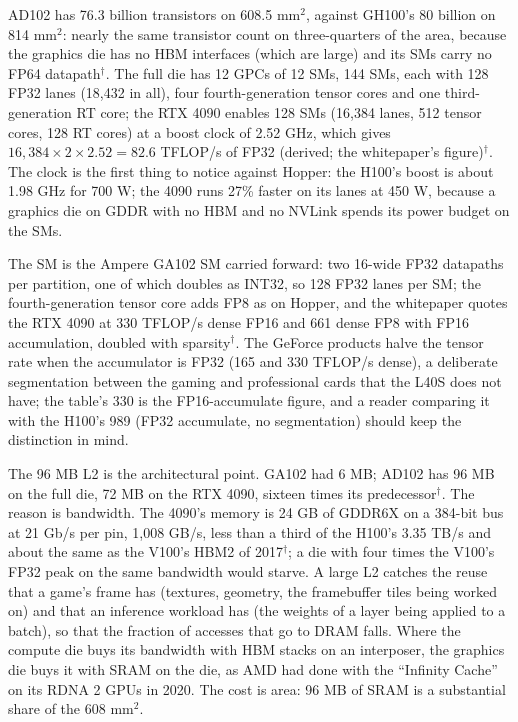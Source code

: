 \documentclass[11pt,letterpaper]{article}
\begin{document}
AD102 has 76.3 billion transistors on 608.5 mm$^2$, against GH100's 80 billion on 814 mm$^2$: nearly the same transistor count on three-quarters of the area, because the graphics die has no HBM interfaces (which are large) and its SMs carry no FP64 datapath$^\dagger$. The full die has 12 GPCs of 12 SMs, 144 SMs, each with 128 FP32 lanes (18{,}432 in all), four fourth-generation tensor cores and one third-generation RT core; the RTX 4090 enables 128 SMs (16{,}384 lanes, 512 tensor cores, 128 RT cores) at a boost clock of 2.52 GHz, which gives $16{,}384\times2\times2.52 = 82.6$ TFLOP/s of FP32 (derived; the whitepaper's figure)$^\dagger$. The clock is the first thing to notice against Hopper: the H100's boost is about 1.98 GHz for 700 W; the 4090 runs 27\% faster on its lanes at 450 W, because a graphics die on GDDR with no HBM and no NVLink spends its power budget on the SMs.

The SM is the Ampere GA102 SM carried forward: two 16-wide FP32 datapaths per partition, one of which doubles as INT32, so 128 FP32 lanes per SM; the fourth-generation tensor core adds FP8 as on Hopper, and the whitepaper quotes the RTX 4090 at 330 TFLOP/s dense FP16 and 661 dense FP8 with FP16 accumulation, doubled with sparsity$^\dagger$. The GeForce products halve the tensor rate when the accumulator is FP32 (165 and 330 TFLOP/s dense), a deliberate segmentation between the gaming and professional cards that the L40S does not have; the table's 330 is the FP16-accumulate figure, and a reader comparing it with the H100's 989 (FP32 accumulate, no segmentation) should keep the distinction in mind.

The 96 MB L2 is the architectural point. GA102 had 6 MB; AD102 has 96 MB on the full die, 72 MB on the RTX 4090, sixteen times its predecessor$^\dagger$. The reason is bandwidth. The 4090's memory is 24 GB of GDDR6X on a 384-bit bus at 21 Gb/s per pin, 1{,}008 GB/s, less than a third of the H100's 3.35 TB/s and about the same as the V100's HBM2 of 2017$^\dagger$; a die with four times the V100's FP32 peak on the same bandwidth would starve. A large L2 catches the reuse that a game's frame has (textures, geometry, the framebuffer tiles being worked on) and that an inference workload has (the weights of a layer being applied to a batch), so that the fraction of accesses that go to DRAM falls. Where the compute die buys its bandwidth with HBM stacks on an interposer, the graphics die buys it with SRAM on the die, as AMD had done with the ``Infinity Cache'' on its RDNA 2 GPUs in 2020. The cost is area: 96 MB of SRAM is a substantial share of the 608 mm$^2$.
\end{document}

